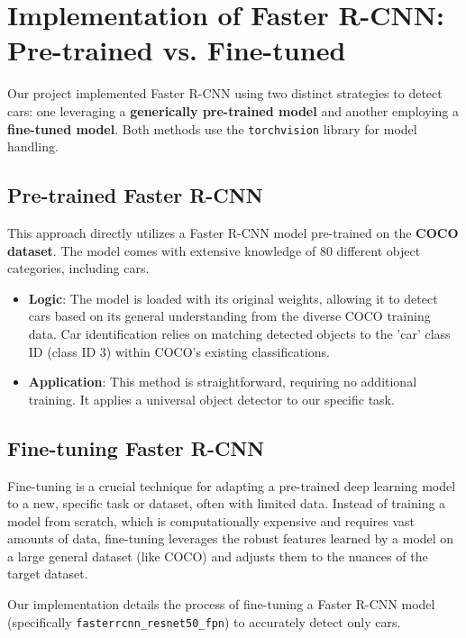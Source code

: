 \documentclass[12pt,a4paper]{article}
\begin{document}
\section{Implementation of Faster R-CNN: Pre-trained vs. Fine-tuned}
\label{sec:fasterrcnn_implementations}

Our project implemented Faster R-CNN using two distinct strategies to detect cars: one leveraging a \textbf{generically pre-trained model} and another employing a \textbf{fine-tuned model}. Both methods use the \texttt{torchvision} library for model handling.

\subsection{Pre-trained Faster R-CNN}
This approach directly utilizes a Faster R-CNN model pre-trained on the \textbf{COCO dataset}. The model comes with extensive knowledge of 80 different object categories, including cars.

\begin{itemize}
    \item \textbf{Logic}: The model is loaded with its original weights, allowing it to detect cars based on its general understanding from the diverse COCO training data. Car identification relies on matching detected objects to the 'car' class ID (class ID 3) within COCO's existing classifications.
    \item \textbf{Application}: This method is straightforward, requiring no additional training. It applies a universal object detector to our specific task.
\end{itemize}

\subsection{Fine-tuning Faster R-CNN}
\label{ssec:fasterrcnn_finetuning}

Fine-tuning is a crucial technique for adapting a pre-trained deep learning model to a new, specific task or dataset, often with limited data. Instead of training a model from scratch, which is computationally expensive and requires vast amounts of data, fine-tuning leverages the robust features learned by a model on a large general dataset (like COCO) and adjusts them to the nuances of the target dataset.

Our implementation details the process of fine-tuning a Faster R-CNN model (specifically \texttt{fasterrcnn\_resnet50\_fpn}) to accurately detect only cars.
\end{document}
